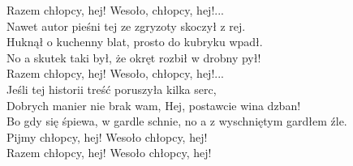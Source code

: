 Razem chłopcy, hej! Wesoło, chłopcy, hej!... \\

Nawet autor pieśni tej ze zgryzoty skoczył z rej. \\
Huknął o kuchenny blat, prosto do kubryku wpadł. \\
No a skutek taki był, że okręt rozbił w drobny pył! \\

Razem chłopcy, hej! Wesoło, chłopcy, hej!... \\

Jeśli tej historii treść poruszyła kilka serc, \\
Dobrych manier nie brak wam, Hej, postawcie wina dzban! \\
Bo gdy się śpiewa, w gardle schnie, no a z wyschniętym gardłem źle. \\

Pijmy chłopcy, hej! Wesoło chłopcy, hej! \\
Razem chłopcy, hej! Wesoło chłopcy, hej!  \\